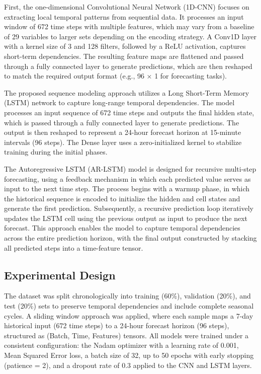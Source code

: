 \documentclass[conference]{IEEEtran}
\begin{document}
	First, the one-dimensional Convolutional Neural Network (1D-CNN) focuses on extracting local temporal patterns from sequential data. It processes an input window of 672 time steps with multiple features, which may vary from a baseline of 29 variables to larger sets depending on the encoding strategy. A Conv1D layer with a kernel size of 3 and 128 filters, followed by a ReLU activation, captures short-term dependencies. The resulting feature maps are flattened and passed through a fully connected layer to generate predictions, which are then reshaped to match the required output format (e.g., 96 × 1 for forecasting tasks).
	
	The proposed sequence modeling approach utilizes a Long Short-Term Memory (LSTM) network to capture long-range temporal dependencies. The model processes an input sequence of 672 time steps and outputs the final hidden state, which is passed through a fully connected layer to generate predictions. The output is then reshaped to represent a 24-hour forecast horizon at 15-minute intervals (96 steps). The Dense layer uses a zero-initialized kernel to stabilize training during the initial phases.
	
	The Autoregressive LSTM (AR-LSTM) model is designed for recursive multi-step forecasting, using a feedback mechanism in which each predicted value serves as input to the next time step. The process begins with a warmup phase, in which the historical sequence is encoded to initialize the hidden and cell states and generate the first prediction. Subsequently, a recursive prediction loop iteratively updates the LSTM cell using the previous output as input to produce the next forecast. This approach enables the model to capture temporal dependencies across the entire prediction horizon, with the final output constructed by stacking all predicted steps into a time-feature tensor.
	
	\subsection{Experimental Design}
	The dataset was split chronologically into training (60\%), validation (20\%), and test (20\%) sets to preserve temporal dependencies and include complete seasonal cycles. A sliding window approach was applied, where each sample maps a 7-day historical input (672 time steps) to a 24-hour forecast horizon (96 steps), structured as (Batch, Time, Features) tensors. All models were trained under a consistent configuration: the Nadam optimizer with a learning rate of 0.001, Mean Squared Error loss, a batch size of 32, up to 50 epochs with early stopping (patience = 2), and a dropout rate of 0.3 applied to the CNN and LSTM layers.
	
\end{document}
